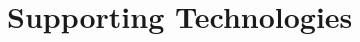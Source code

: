 \documentclass[ %
                    author={Carlos Duran Calle},
                supervisor={Dr. Felipe Campelo},
                    degree={MSc},
                     title={Comparative Machine Learning Analysis for Student Dropout Prediction in a Virtual Learning Environment},
                  subtitle={Incorporating Student Engagement and Socio-Economic Features},
                      type={},
                      year={2025}]{dissertation}
\begin{document}


%
%
%


\chapter*{Supporting Technologies}
\end{document}
